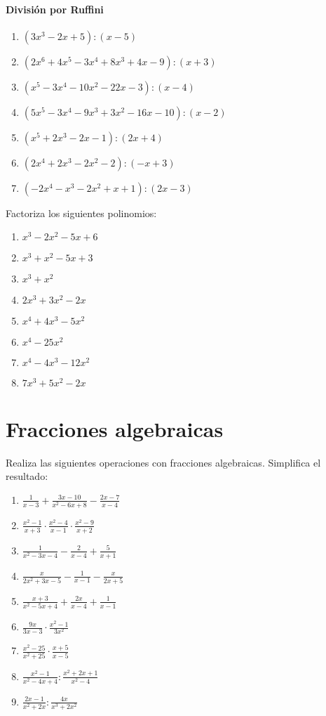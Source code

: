 \paragraph{División por Ruffini}
\begin{enumerate}[topsep=0pt]
	\item $(3x^3 - 2x + 5) : (x-5)$
	\item $(2x^6+4x^5-3x^4+8x^3+4x-9) : (x+3)$
	\item $(x^5-3x^4-10x^2-22x-3) : (x -4)$
	\item $(5x^5-3x^4-9x^3+3x^2-16x-10) : (x - 2) $
	\item $(x^5+2x^3-2x-1):(2x+4)$
	\item $(2x^4+2x^3-2x^2-2):(-x+3)$
	\item $(-2x^4-x^3-2x^2+x+1):(2x-3)$
\end{enumerate}


\Exercicio Factoriza los siguientes polinomios:
\begin{enumerate}[topsep=0pt]
	\item $x^3-2x^2-5x+6$
	\item $x^3+x^2-5x+3$
	\item $x^3 + x^2$
	\item $2x^3 + 3x^2 - 2x$
	\item $x^4 + 4x^3 - 5x^2$
	\item $x^4 - 25x^2$
	\item $x^4 - 4x^3 - 12x^2$
	\item $7x^3 + 5x^2 - 2x$
\end{enumerate}

\section{Fracciones algebraicas}

\Exercicio Realiza las siguientes operaciones con fracciones algebraicas. Simplifica el resultado:
\begin{enumerate}[topsep=0pt]
	\item $\frac{1}{x-3} + \frac{3x-10}{x^2-6x+8} - \frac{2x-7}{x-4}$
	\item $\frac{x^2-1}{x+3} \cdot \frac{x^2-4}{x-1} \cdot \frac{x^2-9}{x+2}$
	\item $ \frac{1}{x^2 - 3x - 4} - \frac{2}{x-4} + \frac{5}{x+1}$
	\item $\frac{x}{2x^2 +3x - 5} - \frac{1}{x-1} - \frac{x}{2x + 5}$
	\item $\frac{x+3}{x^2-5x+4} + \frac{2x}{x-4} + \frac{1}{x-1}$
	\item $ \frac{9x}{3x-3} \cdot \frac{x^2-1}{3x^2}$
	\item $\frac{x^2 - 25}{x^2 + 25} \cdot \frac{x+5}{x-5}$
	\item $\frac{x^2-1}{x^2 - 4x +4} : \frac{x^2 + 2x + 1}{x^2 - 4}$
	\item $\frac{2x-1}{x^2 + 2x} : \frac{4x}{x^3 + 2x^2}$
\end{enumerate}

